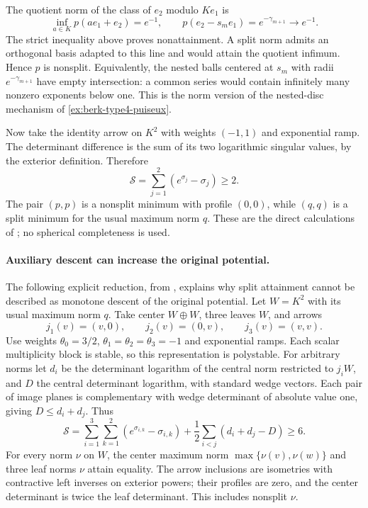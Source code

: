 The quotient norm of the class of $e_2$ modulo $Ke_1$ is
\[
 \inf_{a\in K}p(ae_1+e_2)=e^{-1},\qquad
 p(e_2-s_me_1)=e^{-\gamma_{m+1}}\longrightarrow e^{-1}.
\tag{50.90i}\label{eq:ch50-quiver-unattained-quotient}
\]
The strict inequality above proves nonattainment. A split norm admits
an orthogonal basis adapted to this line and would attain the quotient
infimum. Hence $p$ is nonsplit. Equivalently, the nested balls centered
at $s_m$ with radii $e^{-\gamma_{m+1}}$ have empty intersection: a common
series would contain infinitely many nonzero exponents below one.
This is the norm version of the nested-disc mechanism of
\cref{ex:berk-type4-puiseux}.

Now take the identity arrow on $K^2$ with weights $(-1,1)$ and
exponential ramp. The determinant difference is the sum of its two
logarithmic singular values, by the exterior definition. Therefore
\[
 \mathscr S=\sum_{j=1}^2(e^{\sigma_j}-\sigma_j)\geq2.
\tag{50.90j}\label{eq:ch50-quiver-identity-min}
\]
The pair $(p,p)$ is a nonsplit minimum with profile $(0,0)$, while
$(q,q)$ is a split minimum for the usual maximum norm $q$.
These are the direct calculations of
\cite[\S6.2]{BB26HarmonicQuiverV1}; no spherical completeness is used.

\paragraph{Auxiliary descent can increase the original potential.}
The following explicit reduction, from
\cite[\S6.3]{BB26HarmonicQuiverV1}, explains why split attainment
cannot be described as monotone descent of the original potential.
Let $W=K^2$ with its usual maximum norm $q$. Take center $W\oplus W$,
three leaves $W$, and arrows
\[
 j_1(v)=(v,0),\qquad j_2(v)=(0,v),\qquad j_3(v)=(v,v).
\]
Use weights $\theta_0=3/2$, $\theta_1=\theta_2=\theta_3=-1$ and
exponential ramps. Each scalar multiplicity block is stable, so this
representation is polystable. For arbitrary norms let $d_i$ be the
determinant logarithm of the central norm restricted to $j_iW$, and
$D$ the central determinant logarithm, with standard wedge vectors.
Each pair of image planes is complementary with wedge determinant
of absolute value one, giving $D\leq d_i+d_j$. Thus
\[
 \mathscr S=\sum_{i=1}^3\sum_{k=1}^2(e^{\sigma_{i,k}}-\sigma_{i,k})
       +\frac12\sum_{i<j}(d_i+d_j-D)\geq6.
\tag{50.90k}\label{eq:ch50-quiver-double-D4-bound}
\]
For every norm $\nu$ on $W$, the center maximum norm
$\max\{\nu(v),\nu(w)\}$ and three leaf norms $\nu$ attain equality.
The arrow inclusions are isometries with contractive left inverses on
exterior powers; their profiles are zero, and the center determinant is
twice the leaf determinant. This includes nonsplit $\nu$.

